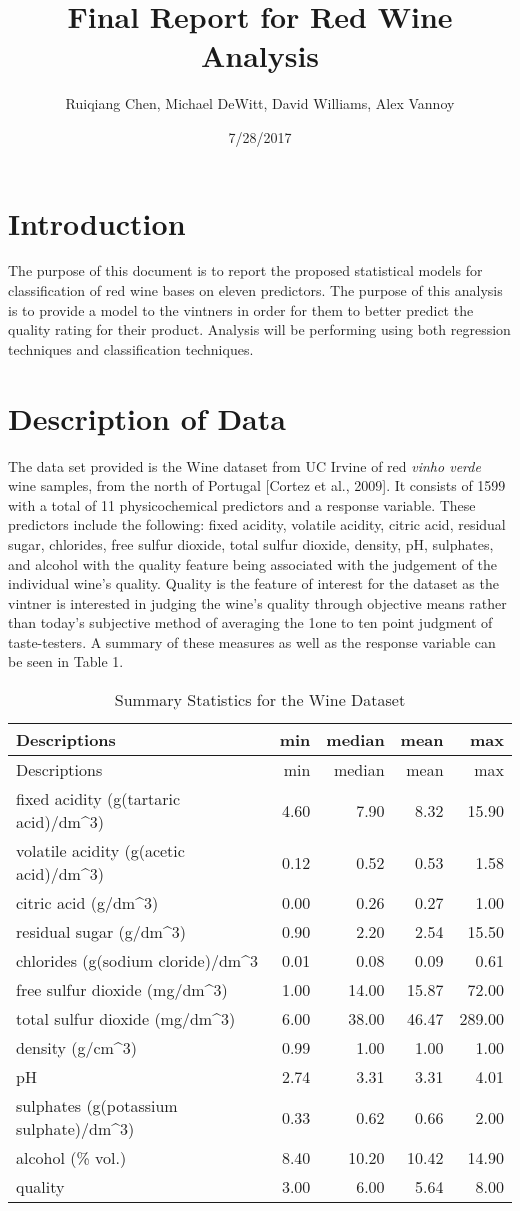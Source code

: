 \documentclass[]{article}
\title{Final Report for Red Wine Analysis}
\author{Ruiqiang Chen, Michael DeWitt, David Williams, Alex Vannoy}
\date{7/28/2017}
\begin{document}
\maketitle

\section{Introduction}\label{introduction}

The purpose of this document is to report the proposed statistical
models for classification of red wine bases on eleven predictors. The
purpose of this analysis is to provide a model to the vintners in order
for them to better predict the quality rating for their product.
Analysis will be performing using both regression techniques and
classification techniques.

\section{Description of Data}\label{description-of-data}

The data set provided is the Wine dataset from UC Irvine of red
\emph{vinho verde} wine samples, from the north of Portugal {[}Cortez et
al., 2009{]}. It consists of 1599 with a total of 11 physicochemical
predictors and a response variable. These predictors include the
following: fixed acidity, volatile acidity, citric acid, residual sugar,
chlorides, free sulfur dioxide, total sulfur dioxide, density, pH,
sulphates, and alcohol with the quality feature being associated with
the judgement of the individual wine's quality. Quality is the feature
of interest for the dataset as the vintner is interested in judging the
wine's quality through objective means rather than today's subjective
method of averaging the 1one to ten point judgment of taste-testers. A
summary of these measures as well as the response variable can be seen
in Table 1.

\begin{longtable}[]{@{}lrrrr@{}}
\caption{Summary Statistics for the Wine Dataset}\tabularnewline
\toprule
Descriptions & min & median & mean & max\tabularnewline
\midrule
\endfirsthead
\toprule
Descriptions & min & median & mean & max\tabularnewline
\midrule
\endhead
fixed acidity (g(tartaric acid)/dm\^{}3) & 4.60 & 7.90 & 8.32 &
15.90\tabularnewline
volatile acidity (g(acetic acid)/dm\^{}3) & 0.12 & 0.52 & 0.53 &
1.58\tabularnewline
citric acid (g/dm\^{}3) & 0.00 & 0.26 & 0.27 & 1.00\tabularnewline
residual sugar (g/dm\^{}3) & 0.90 & 2.20 & 2.54 & 15.50\tabularnewline
chlorides (g(sodium cloride)/dm\^{}3 & 0.01 & 0.08 & 0.09 &
0.61\tabularnewline
free sulfur dioxide (mg/dm\^{}3) & 1.00 & 14.00 & 15.87 &
72.00\tabularnewline
total sulfur dioxide (mg/dm\^{}3) & 6.00 & 38.00 & 46.47 &
289.00\tabularnewline
density (g/cm\^{}3) & 0.99 & 1.00 & 1.00 & 1.00\tabularnewline
pH & 2.74 & 3.31 & 3.31 & 4.01\tabularnewline
sulphates (g(potassium sulphate)/dm\^{}3) & 0.33 & 0.62 & 0.66 &
2.00\tabularnewline
alcohol (\% vol.) & 8.40 & 10.20 & 10.42 & 14.90\tabularnewline
quality & 3.00 & 6.00 & 5.64 & 8.00\tabularnewline
\bottomrule
\end{longtable}
\end{document}
